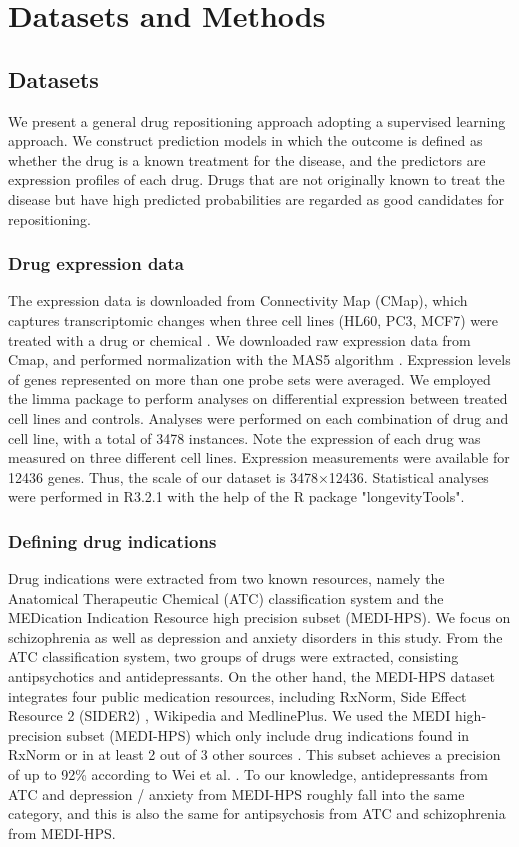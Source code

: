 \section{Datasets and Methods}
  \subsection{Datasets}
    We present a general drug repositioning approach adopting a supervised learning approach. We construct prediction models in which the outcome is defined as whether the drug is a known treatment for the disease, and the predictors are expression profiles of each drug. Drugs that are not originally known to treat the disease but have high predicted probabilities are regarded as good candidates for repositioning.

    \subsubsection{Drug expression data}
      The expression data is downloaded from Connectivity Map (CMap), which captures transcriptomic changes when three cell lines (HL60, PC3, MCF7) were treated with a drug or chemical \cite{lamb2006connectivity}. We downloaded raw expression data from Cmap, and performed normalization with the MAS5 algorithm \cite{pepper2007utility}. Expression levels of genes represented on more than one probe sets were averaged. We employed the limma package \cite{ritchie2015limma} to perform analyses on differential expression between treated cell lines and controls. Analyses were performed on each combination of drug and cell line, with a total of 3478 instances. Note the expression of each drug was measured on three different cell lines. Expression measurements were available for 12436 genes. Thus, the scale of our dataset is 3478×12436. Statistical analyses were performed in R3.2.1 with the help of the R package "longevityTools".

    \subsubsection{Defining drug indications}
      Drug indications were extracted from two known resources, namely the Anatomical Therapeutic Chemical (ATC) classification system and the MEDication Indication Resource high precision subset (MEDI-HPS)\cite{kuhn2016sider}. We focus on schizophrenia as well as depression and anxiety disorders in this study. From the ATC classification system, two groups of drugs were extracted, consisting antipsychotics and antidepressants. On the other hand, the MEDI-HPS dataset integrates four public medication resources, including RxNorm, Side Effect Resource 2 (SIDER2) \cite{kuhn2016sider}, Wikipedia and MedlinePlus. We used the MEDI high-precision subset (MEDI-HPS) which only include drug indications found in RxNorm or in at least 2 out of 3 other sources \cite{wei2013development}. This subset achieves a precision of up to 92\% according to Wei et al. \cite{wei2013development}. To our knowledge, antidepressants from ATC and depression / anxiety from MEDI-HPS roughly fall into the same category, and this is also the same for antipsychosis from ATC and schizophrenia from MEDI-HPS. 

